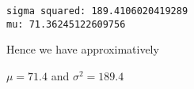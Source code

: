 \documentclass[11pt]{article}
\makeatletter
\newcommand{\boxspacing}{\kern\kvtcb@left@rule\kern\kvtcb@boxsep}
\newcommand{\prompt}[4]{
        {\ttfamily\llap{{\color{#2}[#3]:\hspace{3pt}#4}}\vspace{-\baselineskip}}
    }
\makeatother
\begin{document}
    \begin{Verbatim}[commandchars=\\\{\}]
sigma squared: 189.4106020419289
mu: 71.36245122609756
    \end{Verbatim}

    \begin{tcolorbox}[breakable, size=fbox, boxrule=1pt, pad at break*=1mm,colback=cellbackground, colframe=cellborder]
\prompt{In}{incolor}{ }{\boxspacing}

\end{tcolorbox}

Hence we have approximatively

$\mu=71.4$  and $\sigma^2=189.4$






   
   




    
    
    
\end{document}
